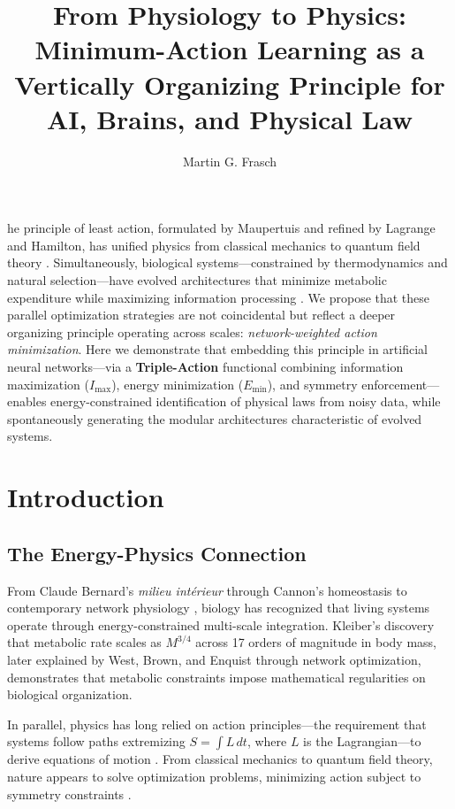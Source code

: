 \documentclass[9pt,twocolumn,twoside]{pnas-new}
\title{From Physiology to Physics: Minimum-Action Learning as a Vertically Organizing Principle for AI, Brains, and Physical Law}
\author[a,b,1]{Martin G. Frasch}
\affil[a]{Institute on Human Development and Disability, University of Washington, Seattle, WA, USA}
\affil[b]{Health Stream Analytics, LLC, Seattle, WA, USA}
\begin{document}
\maketitle
\thispagestyle{firststyle}

he principle of least action, formulated by Maupertuis and refined by Lagrange and Hamilton, has unified physics from classical mechanics to quantum field theory \cite{Feynman1965}. Simultaneously, biological systems---constrained by thermodynamics and natural selection---have evolved architectures that minimize metabolic expenditure while maximizing information processing \cite{West1997, Kleiber1932}. We propose that these parallel optimization strategies are not coincidental but reflect a deeper organizing principle operating across scales: \textit{network-weighted action minimization}. Here we demonstrate that embedding this principle in artificial neural networks---via a \textbf{Triple-Action} functional combining information maximization ($I_{\mathrm{max}}$), energy minimization ($E_{\mathrm{min}}$), and symmetry enforcement---enables energy-constrained identification of physical laws from noisy data, while spontaneously generating the modular architectures characteristic of evolved systems.

\section*{Introduction}

\subsection*{The Energy-Physics Connection}
From Claude Bernard's \textit{milieu intérieur} \cite{Bernard1865} through Cannon's homeostasis \cite{Cannon1929} to contemporary network physiology \cite{Barabasi2004}, biology has recognized that living systems operate through energy-constrained multi-scale integration. Kleiber's discovery \cite{Kleiber1932} that metabolic rate scales as $M^{3/4}$ across 17 orders of magnitude in body mass, later explained by West, Brown, and Enquist \cite{West1997} through network optimization, demonstrates that metabolic constraints impose mathematical regularities on biological organization.

In parallel, physics has long relied on action principles---the requirement that systems follow paths extremizing $S = \int L \, dt$, where $L$ is the Lagrangian---to derive equations of motion \cite{Goldstein1980}. From classical mechanics to quantum field theory, nature appears to solve optimization problems, minimizing action subject to symmetry constraints \cite{Weinberg1995}.
\end{document}

